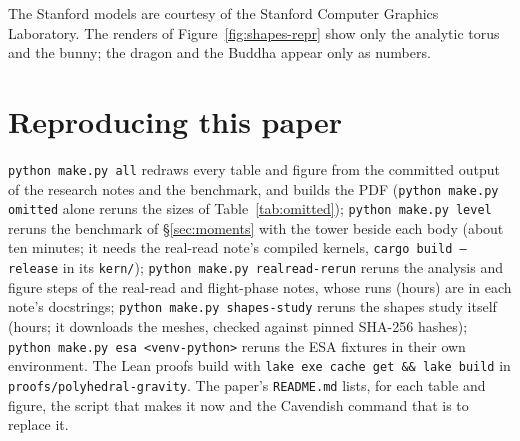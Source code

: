 \documentclass[10pt,a4paper]{article}
\begin{document}
The Stanford models are courtesy of the Stanford Computer Graphics Laboratory. The renders of
Figure~\ref{fig:shapes-repr} show only the analytic torus and the bunny; the dragon and the Buddha
appear only as numbers.

\section{Reproducing this paper}\label{app:repro}
\texttt{python make.py all} redraws every table and figure from the committed output of the research
notes and the benchmark, and builds the PDF (\texttt{python make.py omitted} alone reruns the sizes of
Table~\ref{tab:omitted}); \texttt{python make.py level} reruns the benchmark of
\S\ref{sec:moments} with the tower beside each body (about ten minutes; it needs the real-read note's
compiled kernels, \texttt{cargo build --release} in its \texttt{kern/});
\texttt{python make.py realread-rerun} reruns the analysis and figure steps of the real-read and
flight-phase notes, whose runs (hours) are in each note's docstrings; \texttt{python make.py
shapes-study} reruns the shapes study itself (hours; it downloads the meshes, checked against pinned
SHA-256 hashes); \texttt{python make.py esa <venv-python>} reruns the ESA fixtures in their own
environment. The Lean proofs build with \texttt{lake exe cache get \&\& lake build} in
\texttt{proofs/polyhedral-gravity}. The paper's \texttt{README.md} lists, for each table and figure,
the script that makes it now and the Cavendish command that is to replace it.

\renewcommand{\bibfont}{\small}

\end{document}

